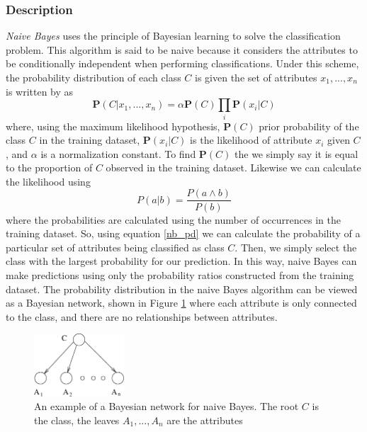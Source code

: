 \documentclass{article}
\newcommand{\ve}[1]{\boldsymbol{\mathbf{#1}}}
\begin{document}
			\subsubsection{Description}
				\label{nb_des}
				\textit{Naive Bayes} uses the principle of Bayesian learning to solve the classification problem. This algorithm is said to be naive because it considers the attributes to be conditionally independent when performing classifications. Under this scheme, the probability distribution of each class $C$ is given the set of attributes $x_1,...,x_n$ is written by \cite{ai} as
				\begin{equation}					
					\ve{P}(C|x_1,...,x_n) = \alpha \ve{P}(C) \prod_i \ve{P}(x_i| C) \label{nb_pd}
				\end{equation}
				where, using the maximum likelihood hypothesis, $\ve{P}(C)$ prior probability of the class $C$ in the training dataset, $\ve{P}(x_i|C)$ is the likelihood of attribute $x_i$ given $C$, and $\alpha$ is a normalization constant. To find $\ve{P}(C)$ the we simply say it is equal to the proportion of $C$ observed in the training dataset. Likewise we can calculate the likelihood using
				\begin{equation*}
					P(a|b) = \frac{P(a \land b)}{P(b)}
				\end{equation*}
				where the probabilities are calculated using the number of occurrences in the training dataset. So, using equation \ref{nb_pd} we can calculate the probability of a particular set of attributes being classified as class $C$. Then, we simply select the class with the largest probability for our prediction. In this way, naive Bayes can make predictions using only the probability ratios constructed from the training dataset. The probability distribution in the naive Bayes algorithm can be viewed as a Bayesian network, shown in Figure \ref{nb} where each attribute is only connected to the class, and there are no relationships between attributes.
				\begin{figure}[h]
					\centering
					\includegraphics[width=0.3\textwidth]{fig/nb}
					\caption{An example of a Bayesian network for naive Bayes. The root $C$ is the class, the leaves $A_1,...,A_n$ are the attributes \cite{Friedman1997}}
					\label{nb}
				\end{figure}
\end{document}
